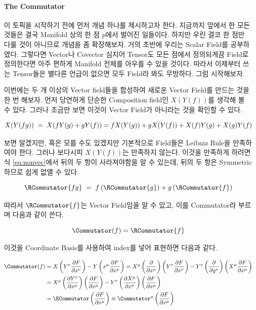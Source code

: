\documentclass[final]{IEEEphot} %
\numberwithin{equation}{section} %
\numberwithin{figure}{section} %
\numberwithin{table}{section} %
\theoremstyle{plain}
\newcommand{\Hs}{\hspace{0.1cm}}
\newcommand{\HS}{\hspace{0.5cm}}
\newcommand{\PD}[2]{\frac{\partial #1}{\partial #2}}
\newcommand{\BKS}[1]{\left( #1 \right)}
\newcommand{\Basisnp}[1][\mu]{\BKS{\PD{}{x^{#1}}}}
\begin{document}
\paragraph{The Commutator} 이 토픽을 시작하기 전에 먼저 개념 하나를 제시하고자 한다. 지금까지 앞에서 한 모든 것들은 결국 Manifold 상의 한 점 $p$에서 벌어진 일들이다.
하지만 우린 결코 한 점만 다룰 것이 아니므로 개념을 좀 확장해보자. 거의 초반에 우리는 Scalar Field를 공부하였다. 그렇다면 Vector나 Covector 심지어 Tensor도 모든 점에서 정의되게끔
Field로 정의한다면 아주 편하게 Manifold 전체를 아우를 수 있을 것이다. 따라서 이제부터 쓰는 Tensor들은 별다른 언급이 없으면 모두 Field라 봐도 무방하다. 그럼 시작해보자.

\HS 이번에는 두 개 이상의 Vector field들을 합성하여 새로운 Vector Field를 만드는 것을 한 번 해보자. 먼저 당연하게 단순한 Composition field인 $X(Y(f))$를 생각해 볼 수 있다.
그러나 조금만 보면 이것이 Vector Field가 아니라는 것을 확인할 수 있다.

\begin{equation}
\label{eq:nonvec}
 X(Y(fg))\Hs =\Hs X(fY(g)+gY(f)) = fX(Y(g)) + gX(Y(f)) + X(f)Y(g) + X(g)Y(f)
\end{equation}

보면 알겠지만, 혹은 모를 수도 있겠지만 기본적으로 Field들은 Leibniz Rule\footnotemark 을 만족하여야 한다. 그러나 보다시피 $X(Y(f))$는 만족하지 않는다. 
이것을 만족하게 하려면 식 \ref{eq:nonvec}에서 뒤의 두 항이 사라져야함을 알 수 있는데, 뒤의 두 항은 Symmetric하므로 쉽게 없앨 수 있다.

\begin{equation}
 \RCommutator{fg}\Hs=\Hs f\BKS{\RCommutator{g}} + g\BKS{\RCommutator{f}}
\end{equation}

따라서 $\RCommutator{f}$는 Vector Field임을 알 수 있고, 이를 Commutator라 부르며 다음과 같이 쓴다.

\begin{equation}
 \Commutator(f) = \RCommutator{f}
\end{equation}

이것을 Coordinate Basis를 사용하여 index를 넣어 표현하면 다음과 같다.

\begin{align}
 \begin{split}
  \Commutator(f) & = X\BKS{Y^\nu \PD{F}{x^\nu}} - Y\BKS{x^\mu \PD{F}{x^\mu}} = X^\mu \Basisnp \BKS{Y^{\nu}\PD{F}{x^\nu}}-Y^\nu \BKS{\PD{}{y^\nu}}\BKS{X^\mu \PD{F}{x^\mu}} \\
                 & = X^\mu\BKS{\PD{Y^\nu}{x^\mu}}\BKS{\PD{F}{x^\mu}} - Y^\nu\BKS{\PD{X^\mu}{x^\nu}}\BKS{\PD{F}{x^\mu}} \\
                 & = \ECommutator \BKS{\PD{F}{x^\mu}} \equiv \Commutator^\mu \BKS{\PD{F}{x^\mu}}
 \end{split}
\end{align}
\end{document}
